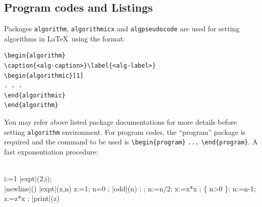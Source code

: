 \documentclass[ml4h-mathphys]{ml4h-jnl}%
\theoremstyle{thmstyleone}%
\theoremstyle{thmstyletwo}%
\theoremstyle{thmstylethree}%
\begin{document}
\subsection{Program codes and Listings}\label{sec7}

Packages \verb+algorithm+, \verb+algorithmicx+ and \verb+algpseudocode+ are used for setting algorithms in \LaTeX\ using the format:

\bigskip
\begin{verbatim}
\begin{algorithm}
\caption{<alg-caption>}\label{<alg-label>}
\begin{algorithmic}[1]
. . .
\end{algorithmic}
\end{algorithm}
\end{verbatim}
\bigskip

You may refer above listed package documentations for more details before setting \verb+algorithm+ environment. For program codes, the ``program'' package is required and the command to be used is \verb+\begin{program}+ \verb+...+ \verb+\end{program}+. A fast exponentiation procedure:

\begin{program}
\BEGIN \\ %
  \FOR i:=1   \DO
     |expt|(2,i); \\ |newline|() \OD %
\WHERE
\PROC |expt|(x,n) \BODY
          z:=1;
          \DO \IF n=0 \THEN \EXIT \FI;
             \DO \IF |odd|(n) \THEN \EXIT \FI;
;
                n:=n/2; x:=x*x \OD;
             \{ n>0 \};
             n:=n-1; z:=z*x \OD;
          |print|(z) \ENDPROC
\END
\end{program}
\end{document}
